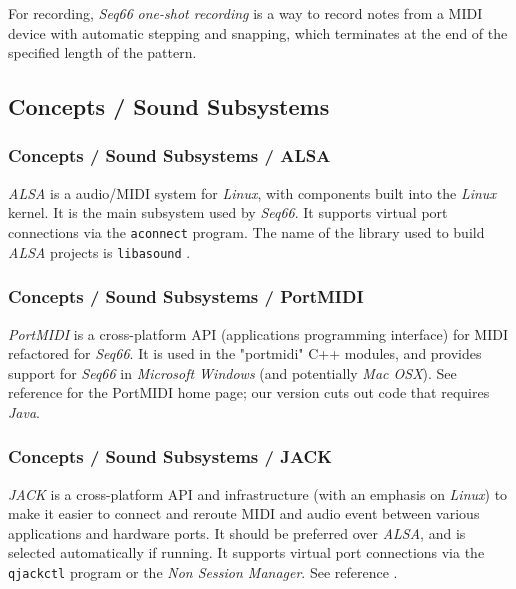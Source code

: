    For recording, 
   \textsl{Seq66} \textsl{one-shot recording} is a way to record notes from a
   MIDI device with automatic stepping and snapping, which terminates at the
   end of the specified length of the pattern.

\subsection{Concepts / Sound Subsystems}
\label{subsec:concepts_sound_subsystems}

\subsubsection{Concepts / Sound Subsystems / ALSA}
\label{subsubsec:concepts_sound_alsa}

   \textsl{ALSA} is a audio/MIDI system for \textsl{Linux}, with components built
   into the \textsl{Linux} kernel. It is the main subsystem used by
   \textsl{Seq66}.
   It supports virtual port connections via the \texttt{aconnect} program.
   The name of the library used to build
   \textsl{ALSA} projects is \texttt{libasound} \cite{alsa}.

\subsubsection{Concepts / Sound Subsystems / PortMIDI}
\label{subsubsec:concepts_sound_portmidi}

   \textsl{PortMIDI} is a cross-platform API (applications programming
   interface) for MIDI refactored for \textsl{Seq66}.
   It is used in the "portmidi" C++ modules, and provides support for
   \textsl{Seq66} in \textsl{Microsoft Windows} (and potentially
   \textsl{Mac OSX}).
   See reference \cite{portmidi} for the PortMIDI home page; our version
   cuts out code that requires \textsl{Java}.

\subsubsection{Concepts / Sound Subsystems / JACK}
\label{subsubsec:concepts_sound_jack}

   \textsl{JACK} is a cross-platform
   API and infrastructure
   (with an emphasis on \textsl{Linux})
   to make it easier to connect and reroute MIDI
   and audio event between various applications and hardware ports.
   It should be preferred over \textsl{ALSA}, and is selected automatically if
   running.
   It supports virtual port connections via the \texttt{qjackctl} program or
   the \textsl{Non Session Manager}.
   See reference \cite{jack}.

